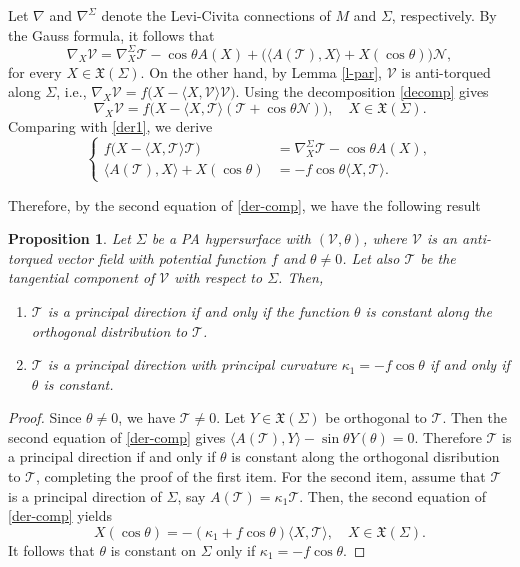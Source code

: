 \documentclass[12pt,reqno]{amsart}
\def\v{\mathcal V}
\def\n{\mathcal N}
\def\t{\mathcal T}
\def\x{\mathfrak X}
\newtheorem{proposition}[theorem]{Proposition}
\theoremstyle{definition}
\begin{document}
Let $\nabla$ and $\nabla^\Sigma$ denote the Levi-Civita connections of $M$ and $\Sigma$, respectively. By the Gauss formula, it follows that
\begin{equation}\label{der1}
\nabla_X\v=\nabla^\Sigma_X\t-\cos \theta A(X)+ \big( \langle A(\t),X\rangle+ X(\cos \theta) \big)\n,
\end{equation}
for every $X\in \x(\Sigma)$. On the other hand, by Lemma \ref{l-par}, $\v$ is anti-torqued along $\Sigma$, i.e., $\nabla_X\v=f\big(X-\langle X,\v\rangle\v\big).$ Using the decomposition \eqref{decomp} gives
$$
\nabla_X\v=f\big(X-\langle X,\t\rangle(\t+\cos \theta\n)  \big), \quad X\in\x(\Sigma).
$$
Comparing with \eqref{der1}, we derive
\begin{equation}\label{der-comp}
\left\{
\begin{aligned}
f\big(X-\langle X,\t\rangle \t\big)
&=\nabla^\Sigma_X\t-\cos \theta A(X),\\[4pt]
\langle A(\t),X\rangle+ X(\cos \theta)
&=-f \cos \theta \langle X,\t\rangle.
\end{aligned}
\right.
\end{equation}

Therefore, by the second equation of \eqref{der-comp}, we have the  following result

\begin{proposition}\label{con-prin}
Let $\Sigma$ be a PA hypersurface with $(\v,\theta)$, where $\v$ is an anti-torqued vector field with potential function $f$ and $\theta\neq 0$. Let also $\t$ be the tangential component of $\v$ with respect to $\Sigma$. Then,
\begin{enumerate}
\item[(i)] $\t$ is a principal direction if and only if the function $\theta$ is constant along the orthogonal distribution to $\t$.
\item[(ii)] $\t$ is a principal direction with principal curvature $\kappa_1=-f\cos\theta$ if and only if $\theta$ is constant.
\end{enumerate}
\end{proposition}
\begin{proof}
Since $\theta\neq 0$, we have $\t\neq 0$. Let $Y\in\x(\Sigma)$ be orthogonal to $\t$. Then
the second equation of \eqref{der-comp} gives $\langle A(\t),Y\rangle-\sin\theta Y(\theta)=0.$ Therefore $\t$ is a principal direction if and only if $\theta$ is constant along the orthogonal disribution to $\t$, completing the proof of the first item. For the second item, assume that $\t$ is a principal direction of $\Sigma $, say $A(\t)=\kappa_1 \t$. Then, the second equation of \eqref{der-comp} yields
\begin{equation}\label{con-prin0}
X(\cos\theta)=-(\kappa_1+f\cos\theta)\langle X,\t\rangle, \quad X\in \x(\Sigma).
\end{equation}
It follows that $\theta$ is constant on $\Sigma$ only if $\kappa_1=-f\cos\theta$. 
\end{proof}
\end{document}
